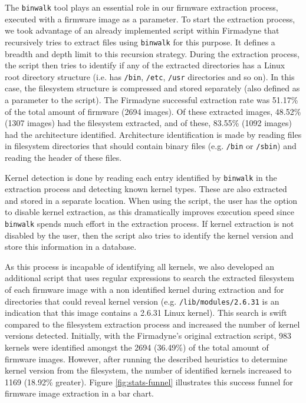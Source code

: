 \documentclass[12pt]{article}
\begin{document}
The {\tt binwalk} tool plays an essential role in our firmware extraction process,
executed with a firmware image as a parameter. To start the extraction process, we took advantage of an already implemented script within Firmadyne \cite{firmadyne} that recursively tries to extract files using {\tt binwalk} for this purpose. It defines a breadth and depth limit to this recursion strategy. During the extraction process, the script then tries to identify if any of the extracted directories has a Linux root directory structure (i.e. has {\tt /bin}, {\tt /etc}, {\tt /usr} directories and so on). In this case, the filesystem structure is compressed and stored separately (also defined as a parameter to the script). The Firmadyne successful extraction rate was 51.17\% of the total amount of firmware (2694 images). Of these extracted images, 48.52\% (1307 images) had the filesystem extracted, and of these, 83.55\% (1092 images) had the architecture identified. Architecture identification is made by reading files in filesystem directories that should contain binary files (e.g. {\tt /bin} or {\tt /sbin}) and reading the header of these files.

Kernel detection is done by reading each entry identified by {\tt binwalk} in the extraction process and detecting known kernel types. These are also extracted and stored in a separate location. When using the script, the user has the option to disable kernel extraction, as this dramatically improves execution speed since {\tt binwalk} spends much effort in the extraction process. If kernel extraction is not disabled by the user, then the script also tries to identify the kernel version and store this information in a database.

As this process is incapable of identifying all kernels, we also developed an additional script that uses regular expressions to search the extracted filesystem of each firmware image with a non identified kernel during extraction and for directories that could reveal kernel version (e.g. {\tt /lib/modules/2.6.31} is an indication that this image contains a 2.6.31 Linux kernel). This search is swift compared to the filesystem extraction process and increased the number of kernel versions detected. Initially, with the Firmadyne's original extraction script, 983 kernels were identified amongst the 2694 (36.49\%) of the total amount of firmware images. However, after running the described heuristics to determine kernel version from the filesystem, the number of identified kernels increased to 1169 (18.92\% greater). Figure \ref{fig:stats-funnel} illustrates this success funnel for firmware image extraction in a bar chart.
\end{document}
